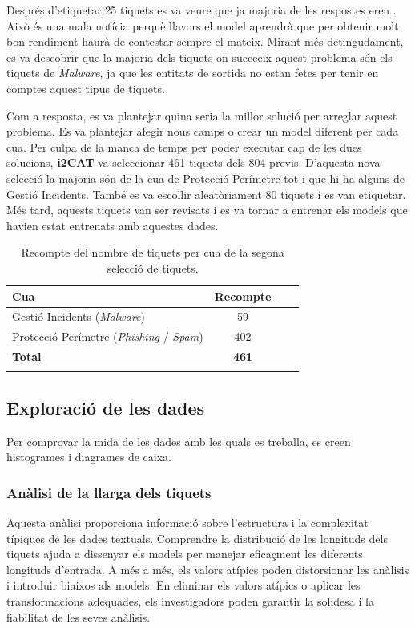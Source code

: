 Després d'etiquetar 25 tiquets es va veure que ja majoria de les respostes eren . Això és una mala notícia perquè llavors el model aprendrà que per obtenir molt bon rendiment haurà de contestar sempre el mateix. Mirant més detingudament, es va descobrir que la majoria dels tiquets on succeeix aquest problema són els tiquets de \textit{Malware}, ja que les entitats de sortida no estan fetes per tenir en comptes aquest tipus de tiquets.

Com a resposta, es va plantejar quina seria la millor solució per arreglar aquest problema. Es va plantejar afegir nous camps o crear un model diferent per cada cua. Per culpa de la manca de temps per poder executar cap de les dues solucions, \textbf{i2CAT} va seleccionar 461 tiquets dels 804 previs. D'aquesta nova selecció la majoria són de la cua de Protecció Perímetre tot i que hi ha alguns de Gestió Incidents. També es va escollir aleatòriament 80 tiquets i es van etiquetar. Més tard, aquests tiquets van ser revisats i es va tornar a entrenar els models que havien estat entrenats amb aquestes dades.

\begin{table}[H]
  \centering
  \begin{tabular}{lccr}
      \Xhline{2\arrayrulewidth}
      \textbf{Cua} & \textbf{Recompte} \\
      \hline
      Gestió Incidents (\textit{Malware}) & 59 \\
      Protecció Perímetre (\textit{Phishing} / \textit{Spam}) & 402  \\
      \hline
      \textbf{Total} & \textbf{461} \\
      \Xhline{2\arrayrulewidth}
  \end{tabular}
  \caption{Recompte del nombre de tiquets per cua de la segona selecció de tiquets.}
  \label{tab:recompte_per_cua_2}
\end{table}





\subsection{Exploració de les dades}
Per comprovar la mida de les dades amb les quals es treballa, es creen histogrames i diagrames de caixa.

\subsubsection{Anàlisi de la llarga dels tiquets}
Aquesta anàlisi proporciona informació sobre l'estructura i la complexitat típiques de les dades textuals. Comprendre la distribució de les longituds dels tiquets ajuda a dissenyar els models per manejar eficaçment les diferents longituds d'entrada. A més a més, els valors atípics poden distorsionar les anàlisis i introduir biaixos als models. En eliminar els valors atípics o aplicar les transformacions adequades, els investigadors poden garantir la solidesa i la fiabilitat de les seves anàlisis.

